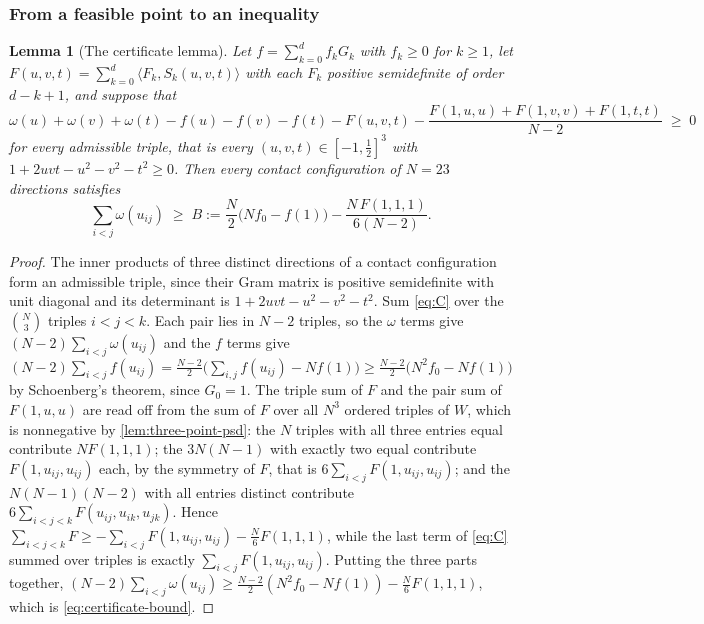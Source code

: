 \documentclass[11pt,reqno]{amsart}
\renewcommand{\_}{\origunderscore\allowbreak}
\numberwithin{equation}{section}
\theoremstyle{plain}
\newtheorem{lem}[thm]{Lemma}
\theoremstyle{definition}
\theoremstyle{remark}
\begin{document}
\subsubsection*{From a feasible point to an inequality}

\begin{lem}[The certificate lemma]\label{lem:certificate}
Let $f=\sum_{k=0}^df_kG_k$ with $f_k\ge0$ for $k\ge1$, let
$F(u,v,t)=\sum_{k=0}^d\langle F_k,S_k(u,v,t)\rangle$ with each $F_k$
positive semidefinite of order $d-k+1$, and suppose that
\begin{equation}\label{eq:C}
  \omega(u)+\omega(v)+\omega(t)-f(u)-f(v)-f(t)-F(u,v,t)
  -\frac{F(1,u,u)+F(1,v,v)+F(1,t,t)}{N-2}\;\ge\;0
\end{equation}
for every admissible triple, that is every $(u,v,t)\in[-1,\tfrac12]^3$
with $1+2uvt-u^2-v^2-t^2\ge0$. Then every contact configuration of $N=23$
directions satisfies
\begin{equation}\label{eq:certificate-bound}
  \sum_{i<j}\omega(u_{ij})\;\ge\;B:=\frac N2\bigl(Nf_0-f(1)\bigr)-\frac{N\,F(1,1,1)}{6(N-2)} .
\end{equation}
\end{lem}

\begin{proof}
The inner products of three distinct directions of a contact
configuration form an admissible triple, since their Gram matrix is
positive semidefinite with unit diagonal and its determinant is
$1+2uvt-u^2-v^2-t^2$. Sum \eqref{eq:C} over the $\binom N3$ triples
$i<j<k$. Each pair lies in $N-2$ triples, so the $\omega$ terms give
$(N-2)\sum_{i<j}\omega(u_{ij})$ and the $f$ terms give
$(N-2)\sum_{i<j}f(u_{ij})=\tfrac{N-2}2\bigl(\sum_{i,j}f(u_{ij})-Nf(1)\bigr)
\ge\tfrac{N-2}2\bigl(N^2f_0-Nf(1)\bigr)$ by Schoenberg's theorem, since
$G_0=1$. The triple sum of $F$ and the pair sum of $F(1,u,u)$ are read
off from the sum of $F$ over all $N^3$ ordered triples of $W$, which is
nonnegative by \cref{lem:three-point-psd}: the $N$ triples with all
three entries equal contribute $NF(1,1,1)$; the $3N(N-1)$ with exactly
two equal contribute $F(1,u_{ij},u_{ij})$ each, by the symmetry of $F$,
that is $6\sum_{i<j}F(1,u_{ij},u_{ij})$; and the $N(N-1)(N-2)$ with all
entries distinct contribute $6\sum_{i<j<k}F(u_{ij},u_{ik},u_{jk})$.
Hence
$\sum_{i<j<k}F\ge-\sum_{i<j}F(1,u_{ij},u_{ij})-\tfrac N6F(1,1,1)$, while
the last term of \eqref{eq:C} summed over triples is exactly
$\sum_{i<j}F(1,u_{ij},u_{ij})$. Putting the three parts together,
$(N-2)\sum_{i<j}\omega(u_{ij})\ge\tfrac{N-2}2(N^2f_0-Nf(1))-\tfrac N6F(1,1,1)$,
which is \eqref{eq:certificate-bound}.
\end{proof}
\end{document}
